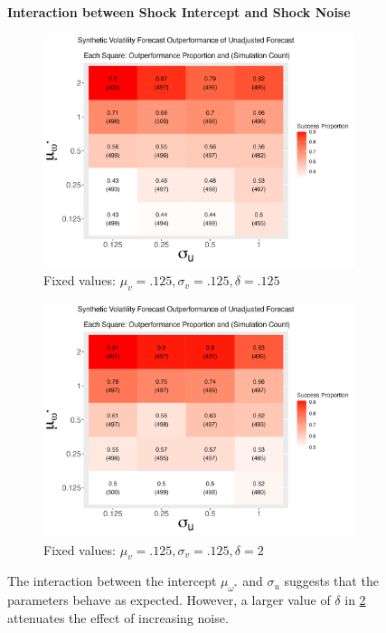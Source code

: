\documentclass[11pt,3p,review,authoryear]{elsarticle}
\theoremstyle{definition}
\begin{document}
\begin{figure}[!h]
  \centering
  \textbf{Interaction between Shock Intercept and Shock Noise}\par\medskip
\begin{subfigure}{.44\linewidth} 
  \centering
    \includegraphics[scale = .42]{simulation_plots/Jul01_192548_2024_mu[omega^star]_sigma[u].png}
    \caption{Fixed values: $\mu_{v} = .125, \sigma_{v} = .125, \delta = .125$}\label{fig:sim_6}
\end{subfigure}\hspace{12mm} %
\begin{subfigure}{.44\linewidth} 
  \centering
    \includegraphics[scale=.42]{simulation_plots/Jul01_192601_2024_mu[omega^star]_sigma[u].png}
    \caption{Fixed values: $\mu_{v} = .125, \sigma_{v} = .125, \delta = 2$}\label{fig:sim_7}
\end{subfigure}

    \caption{The interaction between the intercept $\mu_{\omega^{*}}$ and $\sigma_{u}$ suggests that the parameters behave as expected.  However, a larger value of $\delta$ in \ref{fig:sim_7} attenuates the effect of increasing noise.}
    \label{fig:intercept_noise}
  \end{figure}
\end{document}
